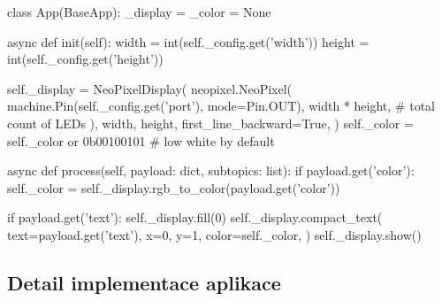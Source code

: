 \begin{code}[
    language=Python,
    caption={Ukázka z implementace výstupní aplikace.},
    label=code:np-display-app
]
class App(BaseApp):
    _display = _color = None

    async def init(self):
        width = int(self._config.get('width'))
        height = int(self._config.get('height'))

        self._display = NeoPixelDisplay(
            neopixel.NeoPixel(
                machine.Pin(self._config.get('port'), mode=Pin.OUT),
                width * height,  # total count of LEDs
            ),
            width, height,
            first_line_backward=True,
        )
        self._color = self._color or 0b00100101  # low white by default

    async def process(self, payload: dict, subtopics: list):
        if payload.get('color'):
            self._color = self._display.rgb_to_color(\*payload.get('color'))

        if payload.get('text'):
            self._display.fill(0)
            self._display.compact_text(
                text=payload.get('text'),
                x=0,
                y=1,
                color=self._color,
            )
            self._display.show()

\end{code}

\subsection{Detail implementace aplikace}


